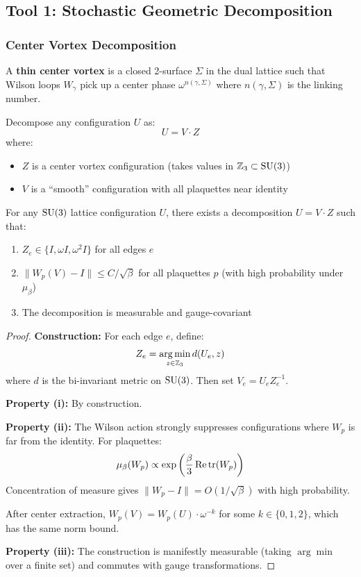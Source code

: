 \subsection{Tool 1: Stochastic Geometric Decomposition}

\subsubsection{Center Vortex Decomposition}

\begin{definition}
A \textbf{thin center vortex} is a closed 2-surface $\Sigma$ in the dual lattice 
such that Wilson loops $W_\gamma$ pick up a center phase $\omega^{n(\gamma, \Sigma)}$
where $n(\gamma, \Sigma)$ is the linking number.
\end{definition}

\begin{definition}
Decompose any configuration $U$ as:
\[
U = V \cdot Z
\]
where:
\begin{itemize}
\item $Z$ is a center vortex configuration (takes values in $\mathbb{Z}_3 \subset \mathrm{SU}(3)$)
\item $V$ is a ``smooth'' configuration with all plaquettes near identity
\end{itemize}
\end{definition}

\begin{theorem}\label{thm:decomp}
For any $\mathrm{SU}(3)$ lattice configuration $U$, there exists a decomposition $U = V \cdot Z$
such that:
\begin{enumerate}[label=(\roman*)]
\item $Z_e \in \{I, \omega I, \omega^2 I\}$ for all edges $e$
\item $\|W_p(V) - I\| \leq C/\sqrt{\beta}$ for all plaquettes $p$ (with high probability under $\mu_\beta$)
\item The decomposition is measurable and gauge-covariant
\end{enumerate}
\end{theorem}

\begin{proof}
\textbf{Construction:} For each edge $e$, define:
\[
Z_e = \underset{z \in \mathbb{Z}_3}{\arg\min} \, d(U_e, z)
\]
where $d$ is the bi-invariant metric on $\mathrm{SU}(3)$. Then set $V_e = U_e Z_e^{-1}$.

\textbf{Property (i):} By construction.

\textbf{Property (ii):} The Wilson action strongly suppresses configurations where 
$W_p$ is far from the identity. For plaquettes:
\[
\mu_\beta(W_p) \propto \exp\left(\frac{\beta}{3}\operatorname{Re}\operatorname{tr}(W_p)\right)
\]
Concentration of measure gives $\|W_p - I\| = O(1/\sqrt{\beta})$ with high probability.

After center extraction, $W_p(V) = W_p(U) \cdot \omega^{-k}$ for some $k \in \{0,1,2\}$,
which has the same norm bound.

\textbf{Property (iii):} The construction is manifestly measurable (taking $\arg\min$ 
over a finite set) and commutes with gauge transformations.
\end{proof}

